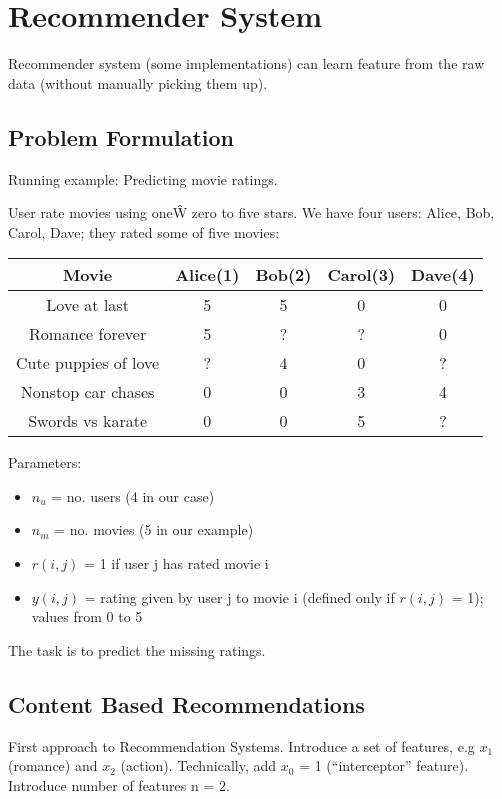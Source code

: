 \documentclass{scrartcl}
\begin{document}
\section{Recommender System}
\label{sec:16}

Recommender system (some implementations) can learn feature from the
raw data (without manually picking them up).
 
\subsection{Problem Formulation}
\label{sec:16-1}
Running example: Predicting movie ratings.

User rate movies using one\^ W zero to five stars. We have four users:
Alice, Bob, Carol, Dave; they rated some of five movies:

\begin{tabular}{c|cccc}
  \textbf{Movie} & \textbf{Alice(1)} & \textbf{Bob(2)} &
  \textbf{Carol(3)} & \textbf{ Dave(4)} \\
  \hline
  Love at last & 5 & 5 & 0 & 0 \\
  Romance forever & 5 & ? & ? & 0 \\
  Cute puppies of love & ? & 4 & 0 & ? \\
  Nonstop car chases & 0 & 0 & 3 & 4 \\
  Swords vs karate & 0 & 0 & 5 & ?
\end{tabular}

Parameters:
\begin{itemize}
\item $n_u$ = no. users (4 in our case)
\item $n_m$ = no. movies (5 in our example)
\item $r(i, j)$ = 1 if user j has rated movie i
\item $y(i, j)$ = rating given by user j to movie i (defined only if
  $r(i, j)$ = 1); values from 0 to 5
\end{itemize}

The task is to predict the missing ratings.

\subsection{Content Based Recommendations}
\label{sec:16-2}

First approach to Recommendation Systems. Introduce a set of features,
e.g $x_1$ (romance) and $x_2$ (action). Technically, add $x_0$ = 1
(``interceptor'' feature). Introduce number of features n = 2.
\end{document}
